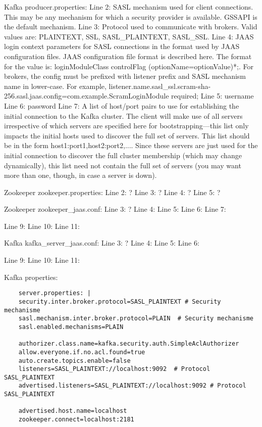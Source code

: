 Kafka producer.properties:
Line 2: SASL mechanism used for client connections. This may be any mechanism for which a security provider is available. GSSAPI is the default mechanism.
Line 3: Protocol used to communicate with brokers. Valid values are: PLAINTEXT, SSL, SASL\_PLAINTEXT, SASL\_SSL.
Line 4: JAAS login context parameters for SASL connections in the format used by JAAS configuration files. JAAS configuration file format is described here. The format for the value is: loginModuleClass controlFlag (optionName=optionValue)*;. For brokers, the config must be prefixed with listener prefix and SASL mechanism name in lower-case. For example, listener.name.sasl\_ssl.scram-sha-256.sasl.jaas.config=com.example.ScramLoginModule required;
Line 5: username
Line 6: password
Line 7: A list of host/port pairs to use for establishing the initial connection to the Kafka cluster. The client will make use of all servers irrespective of which servers are specified here for bootstrapping—this list only impacts the initial hosts used to discover the full set of servers. This list should be in the form host1:port1,host2:port2,.... Since these servers are just used for the initial connection to discover the full cluster membership (which may change dynamically), this list need not contain the full set of servers (you may want more than one, though, in case a server is down).

Zookeeper zookeeper.properties:
Line 2: ?
Line 3: ?
Line 4: ?
Line 5: ?

Zookeeper zookeeper\_jaas.conf:
Line 3: ?
Line 4:
Line 5:
Line 6:
Line 7:

Line 9:
Line 10:
Line 11:


Kafka kafka\_server\_jaas.conf:
Line 3: ?
Line 4:
Line 5:
Line 6:

Line 9:
Line 10:
Line 11:

Kafka properties:
\begin{lstlisting}
    server.properties: |
    security.inter.broker.protocol=SASL_PLAINTEXT # Security mechanisme
    sasl.mechanism.inter.broker.protocol=PLAIN  # Security mechanisme
    sasl.enabled.mechanisms=PLAIN
    
    authorizer.class.name=kafka.security.auth.SimpleAclAuthorizer
    allow.everyone.if.no.acl.found=true
    auto.create.topics.enable=false
    listeners=SASL_PLAINTEXT://localhost:9092  # Protocol SASL_PLAINTEXT
    advertised.listeners=SASL_PLAINTEXT://localhost:9092 # Protocol SASL_PLAINTEXT
    
    advertised.host.name=localhost
    zookeeper.connect=localhost:2181
\end{lstlisting}

